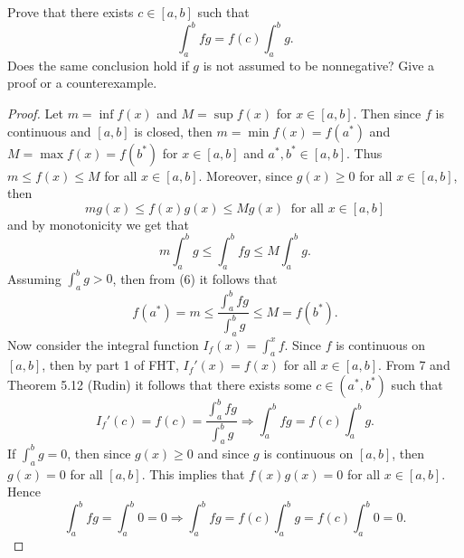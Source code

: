 \documentclass[12pt]{article}
\begin{document}
\begin{enumerate}
            Prove that there exists $c\in[a, b]$ such that 
            \begin{equation*}
                \int_{a}^{b}fg=f(c)\int_{a}^{b}g.
            \end{equation*}
            Does the same conclusion hold if $g$ is not assumed to be
            nonnegative? Give a proof or a counterexample.
            \begin{proof}
                Let $m=\inf f(x)$ and $M=\sup f(x)$ for $x\in[a, b]$. Then
                since $f$ is continuous and $[a, b]$ is closed, then $m=\min
                f(x)=f(a^*)$ and $M=\max f(x)=f(b^*)$ for $x\in[a, b]$ and
                $a^*, b^*\in[a, b]$. Thus $m\leq f(x)\leq
                M$ for all $x\in[a, b]$. Moreover, since $g(x)\geq 0$ for all
                $x\in[a, b]$, then 
                \begin{equation*}
                    mg(x)\leq f(x)g(x)\leq Mg(x)\;\;\text{for all $x\in[a, b]$}
                \end{equation*}
                and by monotonicity we get that
                \begin{equation}
                    m\int_{a}^bg\leq\int_{a}^bfg\leq M\int_{a}^bg.
                \end{equation}
                Assuming $\int_{a}^b g>0$, then from (6) it follows that 
                \begin{equation}
                    f(a^*)=m\leq\frac{\int_{a}^bfg}{\int_{a}^bg}\leq M=f(b^*).
                \end{equation}
                Now consider the integral function $I_f(x)=\int_{a}^x f$. Since
                $f$ is continuous on $[a, b]$, then by part 1 of FHT,
                $I_f'(x)=f(x)$ for all $x\in [a, b]$. From 7 and Theorem 5.12
                (Rudin) it follows that there exists some $c\in(a^*, b^*)$ such
                that 
                \begin{equation*}
                     I_f'(c)=f(c)=\frac{\int_{a}^bfg}{\int_a^b g}\Rightarrow
                    \int_{a}^bfg=f(c)\int_{a}^b g.
                \end{equation*}
                If $\int_a^b g=0$, then since $g(x)\geq 0$ and since $g$ is
                continuous on $[a, b]$, then $g(x)=0$ for all $[a, b]$. This
                implies that $f(x)g(x)=0$ for all $x\in[a, b]$. Hence
                \begin{equation*}
                    \int_{a}^bfg = \int_a^b 0=0\Rightarrow
                    \int_a^bfg=f(c)\int_a^b g=f(c)\int_a^b0=0.

\end{equation*}
\end{proof}
\end{enumerate}
\end{document}
